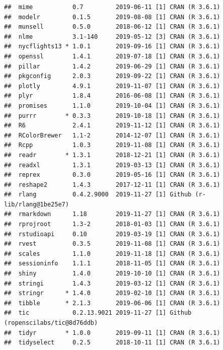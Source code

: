 \documentclass[]{book}
\begin{document}
\begin{verbatim}
##  mime           0.7         2019-06-11 [1] CRAN (R 3.6.1)                   
##  modelr         0.1.5       2019-08-08 [1] CRAN (R 3.6.1)                   
##  munsell        0.5.0       2018-06-12 [1] CRAN (R 3.6.1)                   
##  nlme           3.1-140     2019-05-12 [3] CRAN (R 3.6.1)                   
##  nycflights13 * 1.0.1       2019-09-16 [1] CRAN (R 3.6.1)                   
##  openssl        1.4.1       2019-07-18 [1] CRAN (R 3.6.1)                   
##  pillar         1.4.2       2019-06-29 [1] CRAN (R 3.6.1)                   
##  pkgconfig      2.0.3       2019-09-22 [1] CRAN (R 3.6.1)                   
##  plotly         4.9.1       2019-11-07 [1] CRAN (R 3.6.1)                   
##  plyr           1.8.4       2016-06-08 [1] CRAN (R 3.6.1)                   
##  promises       1.1.0       2019-10-04 [1] CRAN (R 3.6.1)                   
##  purrr        * 0.3.3       2019-10-18 [1] CRAN (R 3.6.1)                   
##  R6             2.4.1       2019-11-12 [1] CRAN (R 3.6.1)                   
##  RColorBrewer   1.1-2       2014-12-07 [1] CRAN (R 3.6.1)                   
##  Rcpp           1.0.3       2019-11-08 [1] CRAN (R 3.6.1)                   
##  readr        * 1.3.1       2018-12-21 [1] CRAN (R 3.6.1)                   
##  readxl         1.3.1       2019-03-13 [1] CRAN (R 3.6.1)                   
##  reprex         0.3.0       2019-05-16 [1] CRAN (R 3.6.1)                   
##  reshape2       1.4.3       2017-12-11 [1] CRAN (R 3.6.1)                   
##  rlang          0.4.2.9000  2019-11-27 [1] Github (r-lib/rlang@1be25e7)     
##  rmarkdown      1.18        2019-11-27 [1] CRAN (R 3.6.1)                   
##  rprojroot      1.3-2       2018-01-03 [1] CRAN (R 3.6.1)                   
##  rstudioapi     0.10        2019-03-19 [1] CRAN (R 3.6.1)                   
##  rvest          0.3.5       2019-11-08 [1] CRAN (R 3.6.1)                   
##  scales         1.1.0       2019-11-18 [1] CRAN (R 3.6.1)                   
##  sessioninfo    1.1.1       2018-11-05 [1] CRAN (R 3.6.1)                   
##  shiny          1.4.0       2019-10-10 [1] CRAN (R 3.6.1)                   
##  stringi        1.4.3       2019-03-12 [1] CRAN (R 3.6.1)                   
##  stringr      * 1.4.0       2019-02-10 [1] CRAN (R 3.6.1)                   
##  tibble       * 2.1.3       2019-06-06 [1] CRAN (R 3.6.1)                   
##  tic            0.2.13.9021 2019-11-27 [1] Github (ropenscilabs/tic@8d76ddb)
##  tidyr        * 1.0.0       2019-09-11 [1] CRAN (R 3.6.1)                   
##  tidyselect     0.2.5       2018-10-11 [1] CRAN (R 3.6.1)                   

\end{verbatim}
\end{document}
